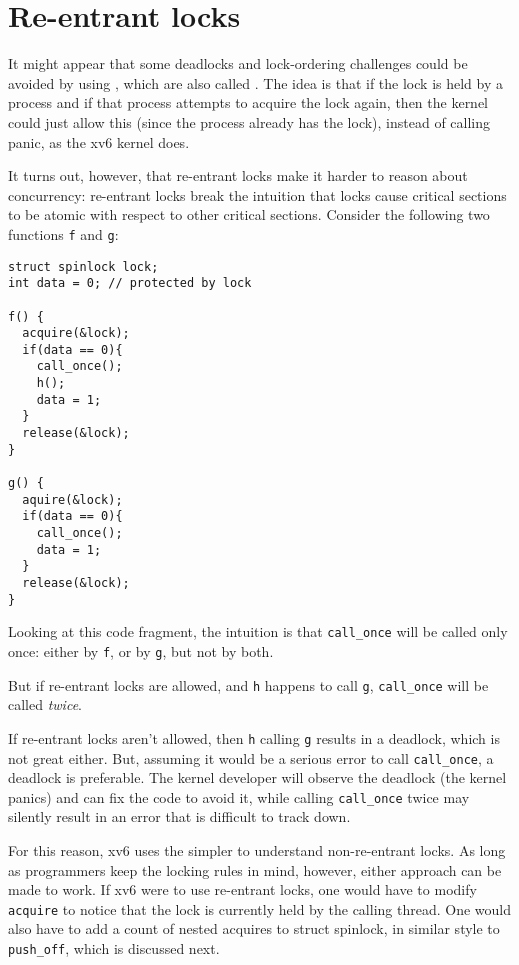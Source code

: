 \section{Re-entrant locks}

It might appear that some deadlocks and lock-ordering challenges could
be avoided by using , which are also
called .  The idea is that if the lock is held
by a process and if that process attempts to acquire the lock again,
then the kernel could just allow this (since the process already has
the lock), instead of calling panic, as the xv6 kernel does.

It turns out, however, that re-entrant locks make it harder to reason
about concurrency: re-entrant locks break the intuition that locks
cause critical sections to be atomic with respect to other critical
sections.  Consider the following two functions \lstinline{f} and
\lstinline{g}:

\begin{lstlisting}
struct spinlock lock;
int data = 0; // protected by lock

f() {
  acquire(&lock);
  if(data == 0){
    call_once();
    h();
    data = 1;
  }
  release(&lock);
}

g() {
  aquire(&lock);
  if(data == 0){
    call_once();
    data = 1;
  }
  release(&lock);
}
\end{lstlisting}

Looking at this code fragment, the intuition is that
\lstinline{call_once} will be called
only once: either by \lstinline{f}, or by \lstinline{g}, but not by
both.

But if re-entrant locks are allowed, and \lstinline{h} happens to call
\lstinline{g}, \lstinline{call_once}
will be called \emph{twice}.

If re-entrant locks aren't allowed, then \lstinline{h} calling
\lstinline{g} results in a deadlock, which is not great either. But,
assuming it would be a serious error to call
\lstinline{call_once}, a deadlock is
preferable.  The kernel developer will observe the deadlock (the
kernel panics) and can fix the code to avoid it, while calling
\lstinline{call_once} twice may
silently result in an error that is difficult to track down.

For this reason, xv6 uses the simpler to understand non-re-entrant
locks.  As long as programmers keep the locking rules in mind,
however, either approach can be made to work. If xv6 were to use
re-entrant locks, one would have to modify \lstinline{acquire} to
notice that the lock is currently held by the calling thread. One
would also have to add a count of nested acquires to struct spinlock,
in similar style to \lstinline{push_off}, which is discussed next.

